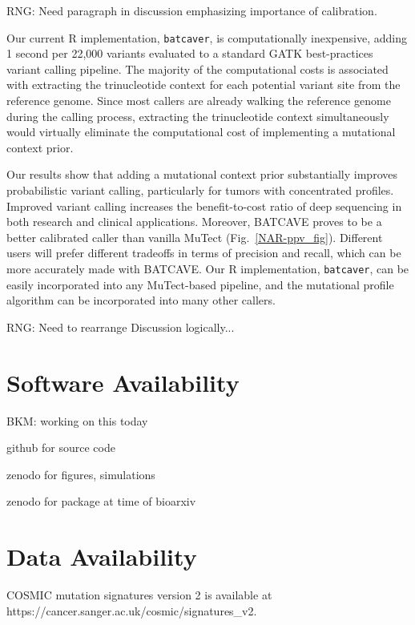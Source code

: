 \documentclass[a4,center,fleqn]{NAR}
\newcommand{\rngcomment}[1]{{\color{red}RNG: #1}}
\newcommand{\bkmcomment}[1]{{\color{blue}BKM: #1}}
\newcommand{\batcave}{BATCAVE\xspace}
\begin{document}
\rngcomment{Need paragraph in discussion emphasizing importance of calibration.}




Our current R implementation, \texttt{batcaver}, is computationally inexpensive, adding 1 second per 22,000 variants evaluated to a standard GATK best-practices variant calling pipeline.
The majority of the computational costs is associated with extracting the trinucleotide context for each potential variant site from the reference genome.
Since most callers are already walking the reference genome during the calling process, extracting the trinucleotide context simultaneously would virtually eliminate the computational cost of implementing a mutational context prior.

Our results show that adding a mutational context prior substantially improves probabilistic variant calling, particularly for tumors with concentrated profiles.
Improved variant calling increases the benefit-to-cost ratio of deep sequencing in both research and clinical applications.
Moreover, \batcave proves to be a better calibrated caller than vanilla MuTect (Fig.~\ref{NAR-ppv_fig}).
Different users will prefer different tradeoffs in terms of precision and recall, which can be more accurately made with \batcave.
Our R implementation, \texttt{batcaver}, can be easily incorporated into any MuTect-based pipeline, and the mutational profile algorithm can be incorporated into many other callers.

\rngcomment{Need to rearrange Discussion logically...}


\section{Software Availability}
\bkmcomment{working on this today}

github for source code

zenodo for figures, simulations

zenodo for package at time of bioarxiv

\section{Data Availability}
COSMIC mutation signatures version 2 is available at \footnotesize{https://cancer.sanger.ac.uk/cosmic/signatures\_v2}.
\end{document}
